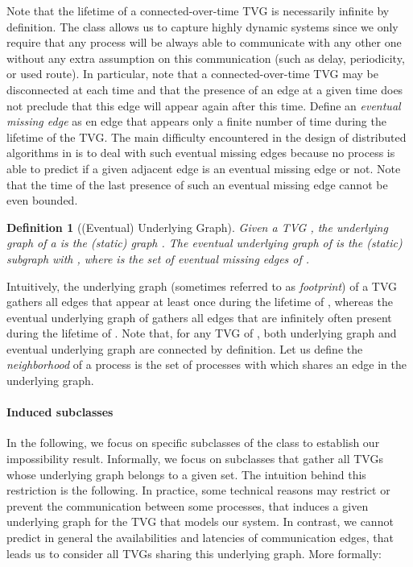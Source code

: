 \documentclass{article}
\newtheorem{definition}{Definition}
\begin{document}
Note that the lifetime of a connected-over-time TVG is necessarily infinite by definition. The class 
allows us to capture highly dynamic systems since we only require that any process will be always able to communicate
with any other one without any extra assumption on this communication (such as delay, periodicity, or used route). In particular, note that a connected-over-time TVG may be disconnected at each time and that the presence of an edge at a given time does not preclude that this edge will appear again after this time.  Define an \emph{eventual missing edge} as en edge that appears only a finite number of time during the lifetime of the TVG. The main difficulty encountered in the design of distributed algorithms in  is to deal with such eventual missing edges because no process is able to predict if a given adjacent edge is an eventual missing edge or not. Note that the time of the last presence of such an eventual missing edge cannot be even bounded.

\begin{definition}[(Eventual) Underlying Graph]\label{def:UG}
Given a TVG , the underlying graph of a  is the (static) graph . The eventual underlying graph of  is the (static) subgraph  with , where  is the set of eventual missing edges of . 
\end{definition}

Intuitively, the underlying graph (sometimes referred to as {\em footprint}) of a TVG  gathers all edges that appear at least once during the lifetime of , whereas the eventual underlying graph of  gathers all edges that are infinitely often present during the lifetime of . Note that, for any TVG of , both underlying graph and eventual underlying graph are connected by definition. Let us define the \emph{neighborhood}  of a process  is the set of processes with which  shares an edge in the underlying graph.

\paragraph{Induced subclasses}

In the following, we focus on specific subclasses of the class  to establish our impossibility result. Informally, we focus on subclasses that gather all TVGs whose underlying graph belongs to a given set. The intuition behind this restriction is the following. In practice, some technical reasons may restrict or prevent the communication between some processes, that induces a given underlying graph for the TVG that models our system. In contrast, we cannot predict in general the availabilities and latencies of communication edges, that leads us to consider all TVGs sharing this underlying graph. More formally:
\end{document}
